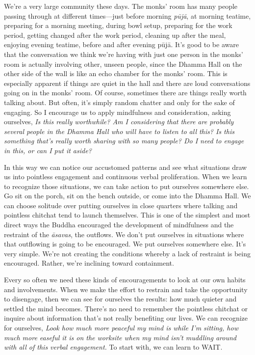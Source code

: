 We're a very large community these days. The monks' room has many 
people passing through at different times---just before morning 
\emph{pūjā}, at morning teatime, preparing for a morning meeting, 
during bowl setup, preparing for the work period, getting changed after 
the work period, cleaning up after the meal, enjoying evening teatime, 
before and after evening pūjā. It's good to be aware that the 
conversation we think we're having with just one person in the monks' 
room is actually involving other, unseen people, since the Dhamma Hall 
on the other side of the wall is like an echo chamber for the monks' 
room. This is especially apparent if things are quiet in the hall and 
there are loud conversations going on in the monks' room. Of course, 
sometimes there are things really worth talking about. But often, it's 
simply random chatter and only for the sake of engaging. So I encourage 
us to apply mindfulness and consideration, asking ourselves, \emph{Is 
this really worthwhile? Am I considering that there are probably 
several people in the Dhamma Hall who will have to listen to all this? 
Is this something that's really worth sharing with so many people? Do I 
need to engage in this, or can I put it aside?}

In this way we can notice our accustomed patterns and see what 
situations draw us into pointless engagement and continuous verbal 
proliferation. When we learn to recognize those situations, we can take 
action to put ourselves somewhere else. Go sit on the porch, sit on the 
bench outside, or come into the Dhamma Hall. We can choose solitude 
over putting ourselves in close quarters where talking and pointless 
chitchat tend to launch themselves. This is one of the simplest and 
most direct ways the Buddha encouraged the development of mindfulness 
and the restraint of the \emph{āsavas}, the outflows. We don't put 
ourselves in situations where that outflowing is going to be 
encouraged. We put ourselves somewhere else. It's very simple. We're 
not creating the conditions whereby a lack of restraint is being 
encouraged. Rather, we're inclining toward containment.

Every so often we need these kinds of encouragements to look at our own 
habits and involvements. When we make the effort to restrain and take 
the opportunity to disengage, then we can see for ourselves the 
results: how much quieter and settled the mind becomes. There's no need 
to remember the pointless chitchat or inquire about information that's 
not really benefiting our lives. We can recognize for ourselves, 
\emph{Look how much more peaceful my mind is while I'm sitting, how 
much more easeful it is on the worksite when my mind isn't muddling 
around with all of this verbal engagement.} To start with, we can learn 
to WAIT.

